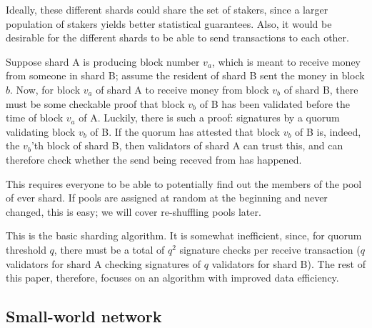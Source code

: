 \documentclass{article}
\begin{document}
Ideally, these different shards could share the set of stakers, since a larger
population of stakers yields better statistical guarantees.  Also, it would be
desirable for the different shards to be able to send transactions to each
other.

Suppose shard A is producing block number $v_a$, which is meant to receive money
from someone in shard B; assume the resident of shard B sent the money in block
$b$.  Now, for block $v_a$ of shard A to receive money from block $v_b$ of shard B,
there must be some checkable proof that block $v_b$ of B has been validated before the
time of block $v_a$ of A.  Luckily, there is such a proof: signatures by a quorum
validating block $v_b$ of B.  If the quorum has attested that block $v_b$ of B is, indeed,
the $v_b$'th block of shard B, then validators of shard A can trust this, and can
therefore check whether the send being receved from has happened.

This requires everyone to be able to potentially find out the members of the pool
of ever shard.  If pools are assigned at random at the beginning and never changed,
this is easy; we will cover re-shuffling pools later.

This is the basic sharding algorithm.  It is somewhat inefficient, since, for
quorum threshold $q$, there must be a total of $q^2$ signature checks per
receive transaction ($q$ validators for shard A checking signatures of $q$
validators for shard B).  The rest of this paper, therefore, focuses on an
algorithm with improved data efficiency.


\subsection{Small-world network}
\end{document}
